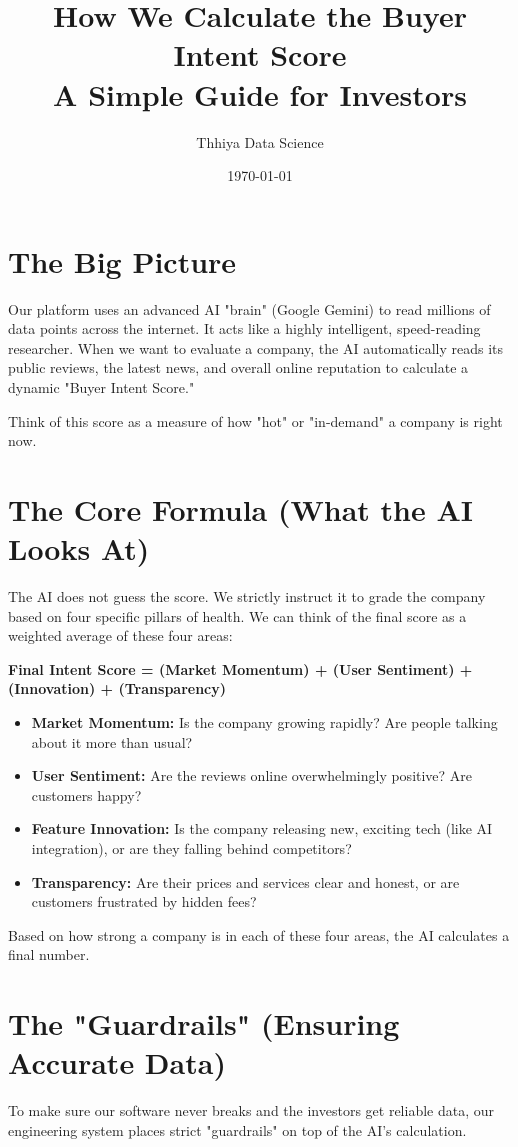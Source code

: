 \documentclass[12pt,a4paper]{article}
\title{\textbf{How We Calculate the Buyer Intent Score \\ \large A Simple Guide for Investors}}
\author{Thhiya Data Science}
\date{\today}
\begin{document}
\maketitle

\section*{The Big Picture}
Our platform uses an advanced AI "brain" (Google Gemini) to read millions of data points across the internet. It acts like a highly intelligent, speed-reading researcher. When we want to evaluate a company, the AI automatically reads its public reviews, the latest news, and overall online reputation to calculate a dynamic "Buyer Intent Score." 

Think of this score as a measure of how "hot" or "in-demand" a company is right now.

\section*{The Core Formula (What the AI Looks At)}
The AI does not guess the score. We strictly instruct it to grade the company based on four specific pillars of health. We can think of the final score as a weighted average of these four areas:

\textbf{Final Intent Score = (Market Momentum) + (User Sentiment) + (Innovation) + (Transparency)}

\begin{itemize}
    \item \textbf{Market Momentum:} Is the company growing rapidly? Are people talking about it more than usual?
    \item \textbf{User Sentiment:} Are the reviews online overwhelmingly positive? Are customers happy?
    \item \textbf{Feature Innovation:} Is the company releasing new, exciting tech (like AI integration), or are they falling behind competitors?
    \item \textbf{Transparency:} Are their prices and services clear and honest, or are customers frustrated by hidden fees?
\end{itemize}

Based on how strong a company is in each of these four areas, the AI calculates a final number.

\section*{The "Guardrails" (Ensuring Accurate Data)}
To make sure our software never breaks and the investors get reliable data, our engineering system places strict "guardrails" on top of the AI's calculation. 
\end{document}
